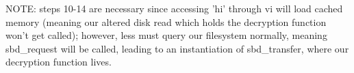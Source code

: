 \documentclass[titlepage,draftclsnofoot,onecolumn]{article}
\begin{document}
  NOTE: steps 10-14 are necessary since accessing 'hi' through vi will load cached memory (meaning our altered disk read which holds the decryption function won't get called); however, less must query our filesystem normally, meaning sbd\_request will be called, leading to an instantiation of sbd\_transfer, where our decryption function lives.
\end{document}
